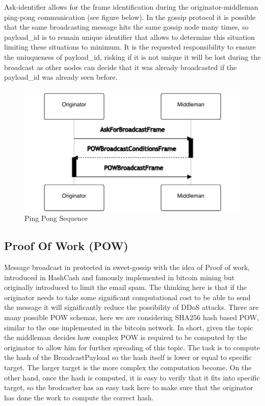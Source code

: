 \documentclass{article}
\begin{document}
Ask-identifier allows for the frame identification during the originator-middleman ping-pong communication (see figure below). In the gossip protocol it is possible that the same broadcasting message hits the same gossip node many times, so payload\_id is to remain unique identifier that allows to determine this situation limiting these situations to minimum. It is the requested responsibility to ensure the uniuqueness of payload\_id, risking if it is not unique it will be lost during the broadcast as other nodes can decide that it was already broadcasted if the payload\_id was already seen before.

\begin{figure}
	\centering
	\includegraphics[scale=0.6]{PingPong.pdf}
	\caption{Ping Pong Sequence}
	\label{fig:fr:pingpong}
\end{figure}

\subsection{Proof Of Work (POW)}
Message broadcast in protected in sweet-gossip with the idea of Proof of work, introduced in HashCash \cite{Hashcash} and famously implemented in bitcoin mining but originally introduced to limit the email spam. The thinking here is that if the originator needs to take some significant computational cost to be able to send the message it will significantly reduce the possibility of DDoS attacks. There are many possible POW schemas, here we are considering SHA256 hash based POW, similar to the one implemented in the bitcoin network. In short, given the topic the middleman decides how complex POW is required to be computed by the originator to allow him for further spreading of this topic. The task is to compute the hash of the BroadcastPayload so the hash itself is lower or equal to specific target. The larger target is the more complex the computation become. On the other hand, once the hash is computed, it is easy to verify that it fits into specific target, so the brodcaster has an easy task here to make sure that the originator has done the work to compute the correct hash.
\end{document}
